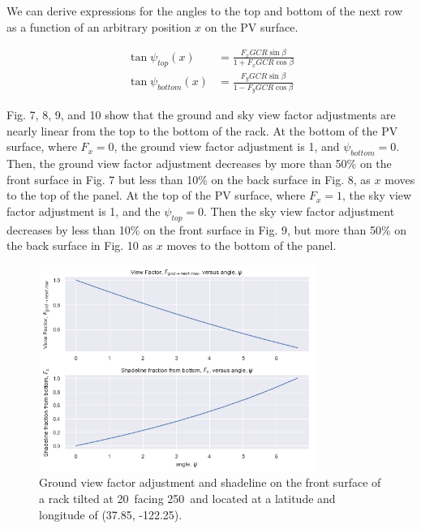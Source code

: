 \documentclass[conference]{IEEEtran}
\begin{document}
We can derive expressions for the angles to the top and bottom of the next row as a function of an arbitrary position $x$ on the PV surface.

\begin{align}
\tan \psi_{top}\left(x \right) &= \frac{F_x GCR \sin \beta}{1 + F_x GCR \cos \beta}\\
\tan \psi_{bottom}\left(x \right) &= \frac{F_y GCR \sin \beta}{1 - F_y GCR \cos \beta}
\end{align}

Fig. 7, 8, 9, and 10 show that the ground and sky view factor adjustments are nearly linear from the top to the bottom of the rack.  At the bottom of the PV surface, where $F_x=0$, the ground view factor adjustment is 1, and $\psi_{bottom}=0$.  Then, the ground view factor adjustment decreases by more than 50\% on the front surface in Fig. 7 but less than 10\% on the back surface in Fig. 8, as $x$ moves to the top of the panel.  At the top of the PV surface, where $F_x=1$, the sky view factor adjustment is 1, and the $\psi_{top}=0$.  Then the sky view factor adjustment decreases by less than 10\% on the front surface in Fig. 9, but more than 50\% on the back surface in Fig. 10 as $x$ moves to the bottom of the panel.

\begin{figure}
\centering
\includegraphics[width=9cm]{ground_diffuse_front_w-next_row.png}
\caption{Ground view factor adjustment and shadeline on the front surface of a rack tilted at 20\degree\ facing 250\degree\ and located at a latitude and longitude of (37.85\degree, -122.25\degree).}
\end{figure}
\end{document}
